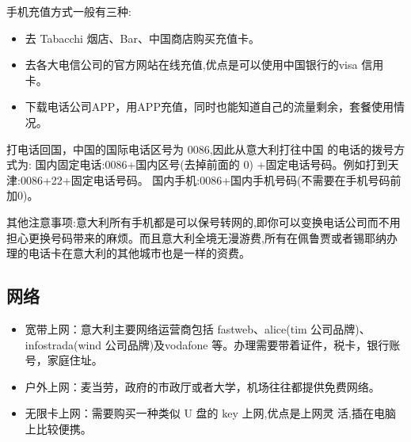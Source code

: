 手机充值方式一般有三种:
\begin{itemize}
\item 去 Tabacchi 烟店、Bar、中国商店购买充值卡。 
\item 去各大电信公司的官方网站在线充值,优点是可以使用中国银行的visa 信用卡。 
\item 下载电话公司APP，用APP充值，同时也能知道自己的流量剩余，套餐使用情况。
\end{itemize}
打电话回国，中国的国际电话区号为 0086,因此从意大利打往中国	的电话的拨号方式为: 国内固定电话:0086+国内区号(去掉前面的 0) +固定电话号码。例如打到天津:0086+22+固定电话号码。 国内手机:0086+国内手机号码(不需要在手机号码前加0)。

 其他注意事项:意大利所有手机都是可以保号转网的,即你可以变换电话公司而不用担心更换号码带来的麻烦。而且意大利全境无漫游费,所有在佩鲁贾或者锡耶纳办理的电话卡在意大利的其他城市也是一样的资费。 
\subsection{网络}

\begin{itemize}
\item 宽带上网：意大利主要网络运营商包括 fastweb、alice(tim 公司品牌)、infostrada(wind 公司品牌)及vodafone 等。办理需要带着证件，税卡，银行账号，家庭住址。
\item 户外上网：麦当劳，政府的市政厅或者大学，机场往往都提供免费网络。
\item 无限卡上网：需要购买一种类似 U 盘的 key 上网,优点是上网灵 活,插在电脑上比较便携。
\end{itemize}
